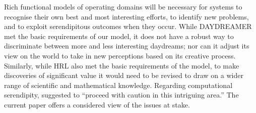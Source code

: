 Rich functional models of operating domains will be necessary for
systems to recognise their own best and most interesting efforts, to
identify new problems, and to exploit serendipitous outcomes when they
occur.  While {\sf DAYDREAMER} met the basic requirements of our
model, it does not have a robust way to discriminate between
more and less interesting daydreams; nor can it adjust its view on
the world to take in new perceptions based on its creative process.
Similarly, while {\sf HRL} also met the basic requirements of the
model, to make discoveries of significant value it would need to be
revised to draw on a wider range of scientific and mathematical
knowledge.  Regarding computational serendipity,
\citet{pease2013discussion} suggested to ``proceed with caution in
this intriguing area.''  The current paper offers a considered view of
the issues at stake.


